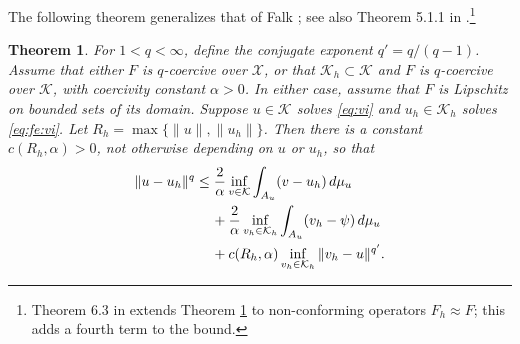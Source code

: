 \documentclass[]{interact}
\theoremstyle{plain}%
\newtheorem{theorem}{Theorem}[section]
\theoremstyle{definition}
\theoremstyle{remark}
\newcommand{\cK}{\mathcal{K}}
\newcommand{\cX}{\mathcal{X}}
\begin{document}
The following theorem generalizes that of Falk \cite{Falk1974}; see also Theorem 5.1.1 in \cite{Ciarlet2002}.\footnote{Theorem 6.3 in \cite{Bueler2024} extends Theorem \ref{thm:genfalk} to non-conforming operators $F_h\approx F$; this adds a fourth term to the bound.}

\begin{theorem} \label{thm:genfalk}  For $1<q<\infty$, define the conjugate exponent $q'=q/(q-1)$.  Assume that either $F$ is $q$-coercive over $\cX$, or that $\cK_h\subset \cK$ and $F$ is $q$-coercive over $\cK$, with coercivity constant $\alpha>0$.  In either case, assume that $F$ is Lipschitz on bounded sets of its domain.  Suppose $u\in\cK$ solves \eqref{eq:vi} and $u_h\in\cK_h$ solves \eqref{eq:fe:vi}.  Let $R_h=\max\{\|u\|,\|u_h\|\}$.  Then there is a constant $c(R_h,\alpha)>0$, not otherwise depending on $u$ or $u_h$, so that
\begin{align}
\|u-u_h\|^q &\le \frac{2}{\alpha} \inf_{v\in\cK} \int_{A_u} (v-u_h)\,d\mu_u \label{eq:falk} \\
   &\quad\, + \frac{2}{\alpha} \inf_{v_h\in\cK_h} \int_{A_u} (v_h-\psi)\,d\mu_u \notag \\
   &\quad\, + c(R_h,\alpha) \inf_{v_h\in\cK_h} \|v_h - u\|^{q'}. \notag
\end{align}
\end{theorem}
\end{document}
